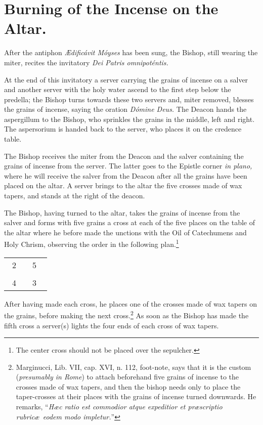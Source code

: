 \documentclass[letterpaper]{report}
\newcommand\crossplan{
\begin{center}
    \begin{tabular}{ | l c r | }
       \hline
        \cross\ {\tiny 2} &         & {\tiny 5} \cross\ \\
                           & \cross &           \\
        \cross\ {\tiny 4} &         & {\tiny 3} \cross\ \\
       \hline
   \end{tabular} 
\end{center}
}
\begin{document}
{    \section{Burning of the Incense on the Altar.}

    \rubric After the antiphon \textit{\AE dificávit Móyses} has been sung, the
    Bishop, still wearing the miter, recites the invitatory \textit{Dei Patris
    omnipoténtis.}

    \rubric At the end of this invitatory a server carrying the grains of
    incense on a salver and another server with the holy water ascend to the
    first step below the predella; the Bishop turns towards these two servers
    and, miter removed, blesses the grains of incense, saying the oration
    \textit{Dómine Deus.} The Deacon hands the aspergillum to the Bishop, who
    sprinkles the grains in the middle, left and right. The aspersorium is
    handed back to the server, who places it on the credence table.

    \rubric The Bishop receives the miter from the Deacon and the salver
    containing the grains of incense from the server. The latter goes to the
    Epistle corner \textit{in plano,} where he will receive the salver from the
    Deacon after all the grains have been placed on the altar. A server brings
    to the altar the five crosses made of wax tapers, and stands at the right
    of the deacon.

    \rubric The Bishop, having turned to the altar, takes the grains of incense
    from the salver and forms with five grains a cross at each of the five
    places on the table of the altar where he before made the unctions with the
    Oil of Catechumens and Holy Chrism, observing the order in the following
    plan.\footnote{The center cross should not be placed over the sepulcher.}

    \crossplan

    After having made each cross, he places one of the crosses made of wax
    tapers on the grains, before making the next cross.\footnote{Marginucci,
    Lib. VII, cap. XVI, n. 112, foot-note, says that it is the custom
    (\textit{presumably in Rome}) to attach beforehand five grains of incense
    to the crosses made of wax tapers, and then the bishop needs only to place
    the taper-crosses at their places with the grains of incense turned
    downwards. He remarks, ``\textit{H\ae c ratio est commodior atque
    expeditior et pr\ae scriptio rubric\ae\ eodem modo impletur.}''} As soon as
    the Bishop has made the fifth cross a server(s) lights the four ends of
    each cross of wax tapers.

}
\end{document}
